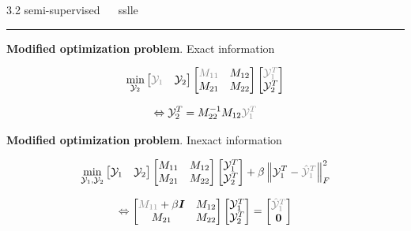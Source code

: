 \documentclass[11pt, compress, t, notes = noshow, xcolor = table, 
aspectratio = 1610]{beamer}
\newcommand{\Y}{\mathcal{Y}}
\newcommand{\I}{\bm{I}}
\newcommand{\frobnorm}[1]{\left\lVert #1 \right\rVert^2_F}
\begin{document}
\LARGE
\begin{frame}{\textcolor{gray!90}{3.2 semi-supervised} ~~ sslle}
\normalsize
\vspace{-0.5cm}
\noindent \textcolor{gray!90}{\rule{\textwidth}{1pt}}
\smallskip

\textbf{Modified optimization problem}. Exact information 

\begin{fleqn}
  \begin{equation}
    \min_{\Y_2}
    \begin{bmatrix} \textcolor{gray!90}{\Y_1} & \Y_2 \end{bmatrix}
    \begin{bmatrix} \textcolor{gray!90}{M_{11}} & M_{12} \\ M_{21} & M_{22} 
    \end{bmatrix}
    \begin{bmatrix} \textcolor{gray!90}{\Y_1^T} \\ \Y_2^T \end{bmatrix}
  \end{equation}
\end{fleqn}

\begin{fleqn}
  \begin{equation}
    \Leftrightarrow \Y_2^T = M_{22}^{-1} M_{12} \textcolor{gray!90}{\Y_1^T}
  \end{equation}
\end{fleqn}

\textbf{Modified optimization problem}. Inexact information 

\begin{fleqn}
  \begin{equation}
    \min_{\Y_1, \Y_2}
    \begin{bmatrix} \Y_1 & \Y_2 \end{bmatrix}
    \begin{bmatrix} M_{11} & M_{12} \\ M_{21} & M_{22} \end{bmatrix}
    \begin{bmatrix} \Y_1^T \\ \Y_2^T \end{bmatrix} +
    \beta \frobnorm{\Y_1^T - \textcolor{gray!90}{\hat{\Y}_1^T}}
  \end{equation}
\end{fleqn}

\begin{fleqn}
  \begin{equation}
    \Leftrightarrow \begin{bmatrix} \textcolor{gray!90}{M_{11}} +
    \beta \I & M_{12} \\ M_{21} & M_{22} \end{bmatrix}
    \begin{bmatrix} \Y_1^T \\ \Y_2^T \end{bmatrix} =
    \begin{bmatrix} \textcolor{gray!90}{\hat{\Y}_1^T} \\ \bm{0} \end{bmatrix}
  \end{equation}
\end{fleqn}


\end{frame}
\end{document}
